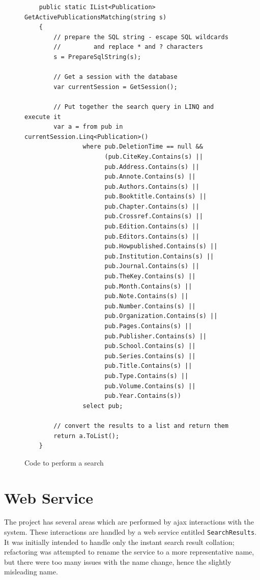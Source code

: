 \begin{figure}
	\begin{center}
			\lstset{language=CSharp} 
			\begin{lstlisting}
	public static IList<Publication> GetActivePublicationsMatching(string s)
	{
	    // prepare the SQL string - escape SQL wildcards 
	    //         and replace * and ? characters
	    s = PrepareSqlString(s);
	    
	    // Get a session with the database
	    var currentSession = GetSession();
	
	    // Put together the search query in LINQ and execute it
	    var a = from pub in currentSession.Linq<Publication>()
	            where pub.DeletionTime == null &&
	                  (pub.CiteKey.Contains(s) ||
	                  pub.Address.Contains(s) ||
	                  pub.Annote.Contains(s) ||
	                  pub.Authors.Contains(s) ||
	                  pub.Booktitle.Contains(s) ||
	                  pub.Chapter.Contains(s) ||
	                  pub.Crossref.Contains(s) ||
	                  pub.Edition.Contains(s) ||
	                  pub.Editors.Contains(s) ||
	                  pub.Howpublished.Contains(s) ||
	                  pub.Institution.Contains(s) ||
	                  pub.Journal.Contains(s) ||
	                  pub.TheKey.Contains(s) ||
	                  pub.Month.Contains(s) ||
	                  pub.Note.Contains(s) ||
	                  pub.Number.Contains(s) ||
	                  pub.Organization.Contains(s) ||
	                  pub.Pages.Contains(s) ||
	                  pub.Publisher.Contains(s) ||
	                  pub.School.Contains(s) ||
	                  pub.Series.Contains(s) ||
	                  pub.Title.Contains(s) ||
	                  pub.Type.Contains(s) ||
	                  pub.Volume.Contains(s) ||
	                  pub.Year.Contains(s))
	            select pub;
	
	    // convert the results to a list and return them
	    return a.ToList();
	}  		
			\end{lstlisting}
		\caption{Code to perform a search}
		\label{fig:PerformSearch}
	\end{center}
\end{figure}




\section{Web Service}
The project has several areas which are performed by \gls{ajax} interactions with the system.  These interactions are handled by a web service entitled \texttt{SearchResults}. It was initially intended to handle only the instant search result collation; refactoring was attempted to rename the service to a more representative name, but there were too many issues with the name change, hence the slightly misleading name.

